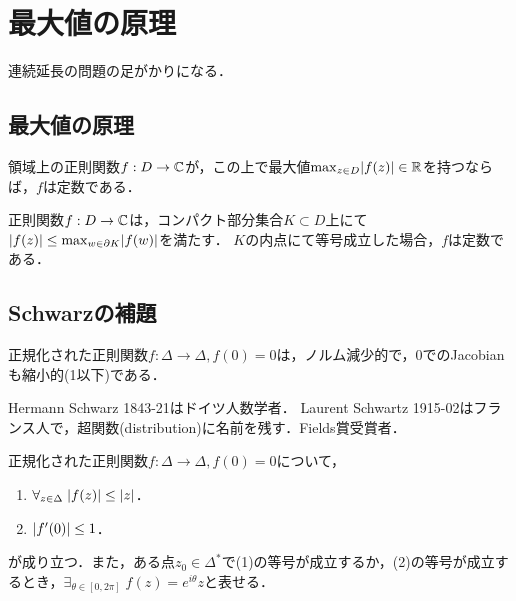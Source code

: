 \documentclass[uplatex, dvipdfmx]{jsreport}
\begin{document}
\section{最大値の原理}

\begin{tcolorbox}[colframe=ForestGreen, colback=ForestGreen!10!white,breakable,colbacktitle=ForestGreen!40!white,coltitle=black,fonttitle=\bfseries\sffamily,
title=]
    連続延長の問題の足がかりになる．
\end{tcolorbox}

\subsection{最大値の原理}

\begin{theorem}
    領域上の正則関数$f:D\to\mathbb{C}$が，この上で最大値$\max_{z\in D}\lvert f(z)\rvert\in\mathbb{R}$を持つならば，$f$は定数である．
\end{theorem}

\begin{corollary}
    正則関数$f:D\to\mathbb{C}$は，コンパクト部分集合$K\subset D$上にて$\lvert f(z)\rvert\le\max_{w\in\partial K}\lvert f(w)\rvert$を満たす．
    $K$の内点にて等号成立した場合，$f$は定数である．
\end{corollary}

\subsection{Schwarzの補題}

\begin{tcolorbox}[colframe=ForestGreen, colback=ForestGreen!10!white,breakable,colbacktitle=ForestGreen!40!white,coltitle=black,fonttitle=\bfseries\sffamily,
title=]
    正規化された正則関数$f:\Delta\to\Delta,f(0)=0$は，ノルム減少的で，$0$でのJacobianも縮小的(1以下)である．
\end{tcolorbox}

\begin{history}
    Hermann Schwarz 1843-21はドイツ人数学者．
    Laurent Schwartz 1915-02はフランス人で，超関数(distribution)に名前を残す．Fields賞受賞者．
\end{history}

\begin{theorem}
    正規化された正則関数$f:\Delta\to\Delta,f(0)=0$について，
    \begin{enumerate}
        \item $\forall_{z\in\Delta}\;\lvert f(z)\rvert\le\lvert z\rvert$．
        \item $\lvert f'(0)\rvert\le 1$．
    \end{enumerate}
    が成り立つ．また，ある点$z_0\in\Delta^*$で(1)の等号が成立するか，(2)の等号が成立するとき，$\exists_{\theta\in[0,2\pi]}\;f(z)=e^{i\theta}z$と表せる．
\end{theorem}
\end{document}
